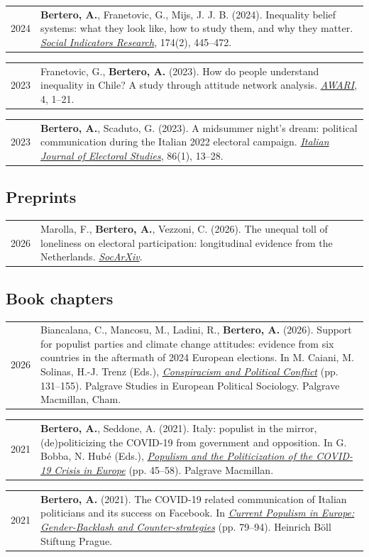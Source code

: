 \documentclass[10pt,a4paper]{article}
\makeatletter
\newlength{\yearw}\setlength{\yearw}{2.3cm}
\newlength{\bodyw}\setlength{\bodyw}{\dimexpr\textwidth-\yearw-0.45cm\relax}
\newcommand{\cv}[2]{%
  \needspace{2\baselineskip}%
  \par\noindent
  \begin{tabular}{@{}>{\raggedright\arraybackslash}p{\yearw}@{\hspace{0.45cm}}>{\raggedright\arraybackslash}p{\bodyw}@{}}
    \sanslabel\fontsize{8.5}{10.5}\selectfont\color{muted}#1 & #2
  \end{tabular}%
  \par\vspace{3pt}%
}
\newcommand{\venue}[1]{\textit{#1}}
\gdef\urlLonelinessToll{https://doi.org/10.31235/osf.io/45hxg_v1}
\makeatother
\begin{document}
\cv{2024}{\textbf{Bertero, A.}, Franetovic, G., Mijs, J. J. B. (2024). Inequality belief systems: what they look like, how to study them, and why they matter. \href{https://doi.org/10.1007/s11205-024-03352-5}{\venue{Social Indicators Research}}, 174(2), 445–472.}

\cv{2023}{Franetovic, G., \textbf{Bertero, A.} (2023). How do people understand inequality in Chile? A study through attitude network analysis. \href{https://doi.org/10.47909/awari.42}{\venue{AWARI}}, 4, 1–21.}

\cv{2023}{\textbf{Bertero, A.}, Scaduto, G. (2023). A midsummer night’s dream: political communication during the Italian 2022 electoral campaign. \href{https://doi.org/10.36253/qoe-14224}{\venue{Italian Journal of Electoral Studies}}, 86(1), 13–28.}

\subsection{Preprints}

\cv{2026}{Marolla, F., \textbf{Bertero, A.}, Vezzoni, C. (2026). The unequal toll of loneliness on electoral participation: longitudinal evidence from the Netherlands. \href{\urlLonelinessToll}{\venue{SocArXiv}}.}

\subsection{Book chapters}

\cv{2026}{Biancalana, C., Mancosu, M., Ladini, R., \textbf{Bertero, A.} (2026). Support for populist parties and climate change attitudes: evidence from six countries in the aftermath of 2024 European elections. In M. Caiani, M. Solinas, H.-J. Trenz (Eds.), \href{https://doi.org/10.1007/978-3-032-13933-7_7}{\venue{Conspiracism and Political Conflict}} (pp. 131–155). Palgrave Studies in European Political Sociology. Palgrave Macmillan, Cham.}

\cv{2021}{\textbf{Bertero, A.}, Seddone, A. (2021). Italy: populist in the mirror, (de)politicizing the COVID-19 from government and opposition. In G. Bobba, N. Hubé (Eds.), \href{https://doi.org/10.1007/978-3-030-66011-6_4}{\venue{Populism and the Politicization of the COVID-19 Crisis in Europe}} (pp. 45–58). Palgrave Macmillan.}

\cv{2021}{\textbf{Bertero, A.} (2021). The COVID-19 related communication of Italian politicians and its success on Facebook. In \href{https://openarchive.tk.mta.hu/467/}{\venue{Current Populism in Europe: Gender-Backlash and Counter-strategies}} (pp. 79–94). Heinrich Böll Stiftung Prague.}
\end{document}
